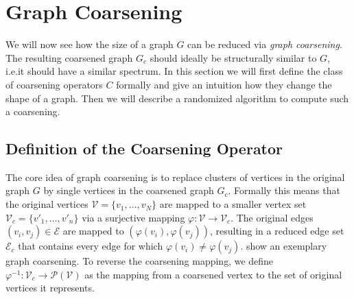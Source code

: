 \section{Graph Coarsening}%
\label{sec:coarse}

We will now see how the size of a graph $G$ can be reduced via \textit{graph coarsening}.
The resulting coarsened graph $G_c$ should ideally be structurally similar to $G$, i.e.\@ it should have a similar spectrum.
In this section we will first define the class of coarsening operators $C$ formally and give an intuition how they change the shape of a graph.
Then we will describe a randomized algorithm to compute such a coarsening.

\subsection{Definition of the Coarsening Operator}%
\label{sec:coarse:formal}

The core idea of graph coarsening is to replace clusters of vertices in the original graph $G$ by single vertices in the coarsened graph $G_c$.
Formally this means that the original vertices $\mathcal{V} = \{ v_1, \dots, v_N \}$ are mapped to a smaller vertex set $\mathcal{V}_c = \{ v'_1, \dots, v'_n \}$ via a surjective mapping $\varphi: \mathcal{V} \to \mathcal{V}_c$.
The original edges $(v_i, v_j) \in \mathcal{E}$ are mapped to $(\varphi(v_i), \varphi(v_j))$, resulting in a reduced edge set $\mathcal{E}_c$ that contains every edge for which $\varphi(v_i) \neq \varphi(v_j)$.
 show an exemplary graph coarsening.
To reverse the coarsening mapping, we define $\varphi^{-1}: \mathcal{V}_c \to \mathcal{P}(\mathcal{V})$ as the mapping from a coarsened vertex to the set of original vertices it represents.

